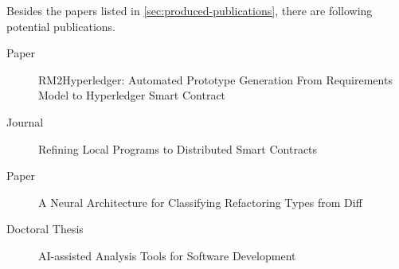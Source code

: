 Besides the papers listed in \autoref{sec:produced-publications}, there are following potential publications.

\begin{description}
\item[Paper] RM2Hyperledger: Automated Prototype Generation From Requirements Model to Hyperledger Smart Contract
\item[Journal] Refining Local Programs to Distributed Smart Contracts
\item[Paper] A Neural Architecture for Classifying Refactoring Types from Diff
\item[Doctoral Thesis] AI-assisted Analysis Tools for Software Development
\end{description}



